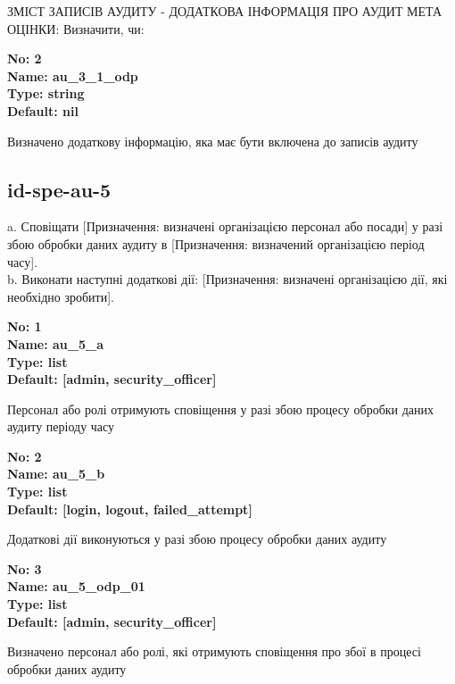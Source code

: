 \documentclass{article}
\begin{document}
{\footnotesize ЗМІСТ ЗАПИСІВ АУДИТУ - ДОДАТКОВА ІНФОРМАЦІЯ ПРО АУДИТ МЕТА ОЦІНКИ: Визначити, чи:}


{\footnotesize\bfseries
No: 2\\
Name: au\_\allowbreak{}3\_\allowbreak{}1\_\allowbreak{}odp\\
Type: string\\
Default: nil
}

{\footnotesize Визначено додаткову інформацію, яка має бути включена до записів аудиту}




\subsection{id-spe-au-5}
a. Сповіщати [Призначення: визначені організацією персонал або посади] у разі збою обробки даних аудиту в [Призначення: визначений організацією період часу].\\ 
b. Виконати наступні додаткові дії: [Призначення: визначені організацією дії, які необхідно зробити].

\vspace{10pt}
{\footnotesize\bfseries
No: 1\\
Name: au\_\allowbreak{}5\_\allowbreak{}a\\
Type: list\\
Default: [\textquotedbl{}admin\textquotedbl{}, \textquotedbl{}security\_\allowbreak{}officer\textquotedbl{}]
}

{\footnotesize Персонал або ролі отримують сповіщення у разі збою процесу обробки даних аудиту періоду часу}


{\footnotesize\bfseries
No: 2\\
Name: au\_\allowbreak{}5\_\allowbreak{}b\\
Type: list\\
Default: [\textquotedbl{}login\textquotedbl{}, \textquotedbl{}logout\textquotedbl{}, \textquotedbl{}failed\_\allowbreak{}attempt\textquotedbl{}]
}

{\footnotesize Додаткові дії виконуються у разі збою процесу обробки даних аудиту}


{\footnotesize\bfseries
No: 3\\
Name: au\_\allowbreak{}5\_\allowbreak{}odp\_\allowbreak{}01\\
Type: list\\
Default: [\textquotedbl{}admin\textquotedbl{}, \textquotedbl{}security\_\allowbreak{}officer\textquotedbl{}]
}

{\footnotesize Визначено персонал або ролі, які отримують сповіщення про збої в процесі обробки даних аудиту }
\end{document}
